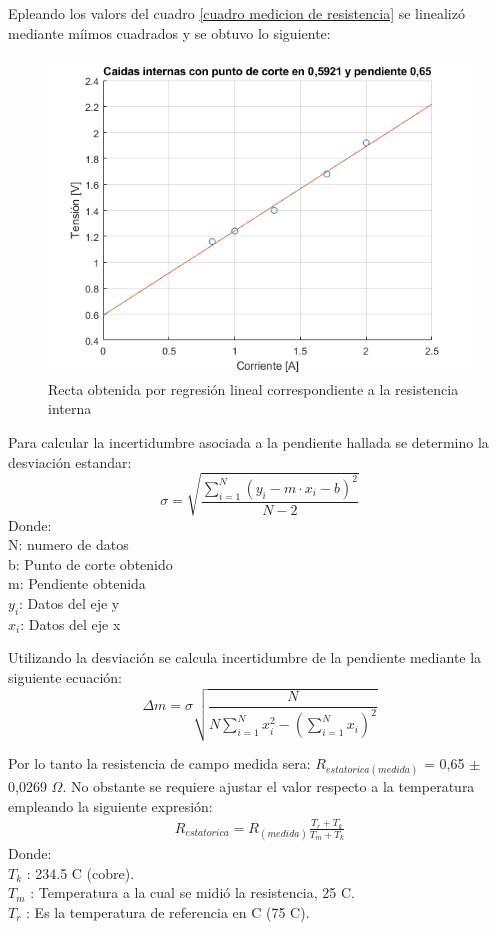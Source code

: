 \documentclass[11pt,letterpaper]{article}     %
\begin{document}
Epleando los valors del cuadro \ref{cuadro medicion de resistencia} se linealizó mediante míimos cuadrados y se obtuvo lo siguiente:

	\begin{figure}[H]
	\centering
	\includegraphics[scale=0.8]{./recursos-Lab8/curvaPruebasDeResistenciaInterna.png}
	\caption{Recta obtenida por regresión lineal correspondiente a la resistencia interna}
	\label{fig:rectaResistenciaInterna}
\end{figure}
Para calcular la incertidumbre asociada a la pendiente hallada se determino la desviación estandar:
\begin{equation}
\sigma = \sqrt{\frac{\sum_{i=1}^{N}(y_{i}-m\cdot x_{i}-b)^{2}}{N-2}} \label{desvEstandar}
\end{equation}
Donde:\\
N: numero de datos\\
b: Punto de corte obtenido\\
m: Pendiente obtenida\\
$y_{i}$: Datos del eje y\\
$x_{i}$: Datos del eje x

Utilizando la desviación se calcula incertidumbre de la pendiente mediante la siguiente ecuación:
\begin{equation}
\Delta m = \sigma \sqrt{\frac{N}{N\sum_{i=1}^{N}x_{i}^{2}-\left(\sum_{i=1}^{N}x_{i}\right)^{2}}} \label{incertiPendiente}
\end{equation}

Por lo tanto la resistencia de campo medida sera: $R_{estatorica(medida)}$ = 0,65 $\pm$ 0,0269 $\Omega$. No obstante se requiere ajustar el valor respecto a la temperatura empleando la siguiente expresión:
\begin{align}
R_{estatorica} = R_{(medida)} \frac{T_{r}+T_{k}}{T_{m}+T_{k}} \label{ajusteTemp}
\end{align}
Donde:\\
$T_{k}$ : 234.5 \textdegree C (cobre).\\
$T_{m}$ : Temperatura a la cual se midió la resistencia, 25 \textdegree C.\\
$T_{r}$ : Es la temperatura de referencia en \textdegree C (75 \textdegree C).\\
\end{document}

